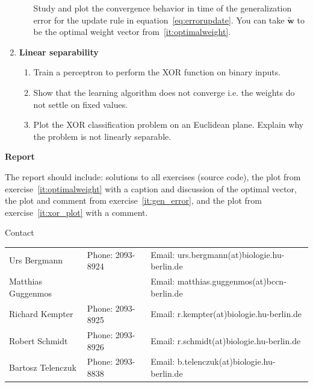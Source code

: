 \documentclass[12pt, a4]{article}
\begin{document}
\begin{enumerate}
\begin{enumerate}
                Study and plot the convergence behavior in time of the
                generalization error for the update rule
                in equation~\ref{eq:errorupdate}. You can take $\mathbf{\tilde
                w}$ to be the optimal weight vector
                from~\ref{it:optimalweight}.
        \end{enumerate}
    \item \textbf{Linear separability}
        \begin{enumerate}
            \item Train a perceptron to perform the XOR function on binary
                inputs.
            \item \label{it:xor_err} Show that the learning algorithm does not converge
                i.e. the weights do not settle on fixed values.
            \item \label{it:xor_plot} Plot the XOR classification problem on an
                Euclidean plane. Explain why the problem is not
                linearly separable. 
        \end{enumerate}

\end{enumerate}

{\bf Report}

The report should include: solutions to all exercises (source code), the plot
from exercise~\ref{it:optimalweight} with a caption and discussion of
the optimal vector, the plot and comment from exercise~\ref{it:gen_error},
and the plot from exercise~\ref{it:xor_plot} with a comment.

\vfill
\centerline{\CAP Contact}
\CAP

\begin{tabular}{lll}
Urs Bergmann & Phone: 2093-8924 & Email:
urs.bergmann(at)biologie.hu-berlin.de \\
Matthias Guggenmos & & Email: matthias.guggenmos(at)bccn-berlin.de \\
Richard Kempter \hfill & Phone: 2093-8925 \hfill & Email:
r.kempter(at)biologie.hu-berlin.de \\
Robert Schmidt & Phone: 2093-8926 & Email: r.schmidt(at)biologie.hu-berlin.de
\\
Bartosz Telenczuk & Phone: 2093-8838 & Email:
b.telenczuk(at)biologie.hu-berlin.de \\
\end{tabular}
\end{document}
